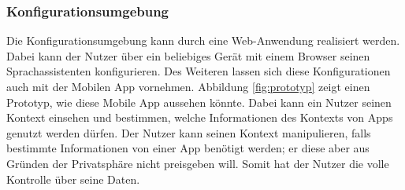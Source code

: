 \subsubsection{Konfigurationsumgebung}
Die Konfigurationsumgebung kann durch eine Web-Anwendung realisiert werden. Dabei kann der Nutzer über ein beliebiges Gerät mit einem Browser seinen Sprachassistenten konfigurieren. Des Weiteren lassen sich diese Konfigurationen auch mit der Mobilen App vornehmen. Abbildung \ref{fig:prototyp} zeigt einen Prototyp, wie diese Mobile App aussehen könnte. Dabei kann ein Nutzer seinen Kontext einsehen und bestimmen, welche Informationen des Kontexts von Apps genutzt werden dürfen. Der Nutzer kann seinen Kontext manipulieren, falls bestimmte Informationen von einer App benötigt werden; er diese aber aus Gründen der Privatsphäre nicht preisgeben will. Somit hat der Nutzer die volle Kontrolle über seine Daten. 

